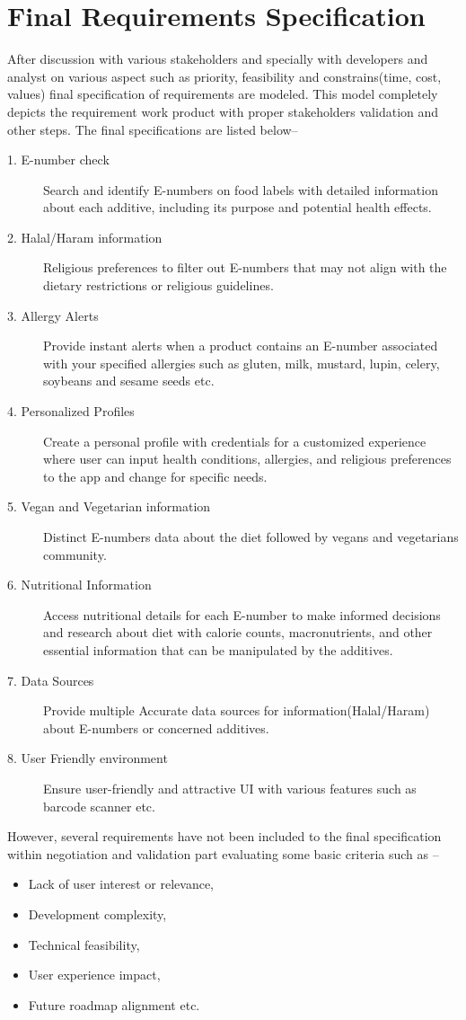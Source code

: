 \documentclass[a4paper,12pt]{report}
\begin{document}
\section*{Final Requirements Specification}
After discussion with various stakeholders and specially with developers and analyst on various aspect such as priority, feasibility and constrains(time, cost, values) final specification of requirements are modeled. This model completely depicts the requirement work product with proper stakeholders validation and other steps. The final specifications are listed below--
\begin{description}
	\item [1. E-number check] Search and identify E-numbers on food labels with detailed information about each additive, including its purpose and potential health effects.
	\item [2. Halal/Haram information] Religious preferences to filter out E-numbers that may not align with the dietary restrictions or religious guidelines.
	\item [3. Allergy Alerts] Provide instant alerts when a product contains an E-number associated with your specified allergies such as gluten, milk, mustard, lupin, celery, soybeans and sesame seeds etc.
	\item [4. Personalized Profiles] Create a personal profile with credentials for a customized experience where user can input health conditions, allergies, and religious preferences to the app and change for specific needs.
	\item [5. Vegan and Vegetarian information] Distinct E-numbers data about the diet followed by vegans and vegetarians community.
	\item [6. Nutritional Information] Access nutritional details for each E-number to make informed decisions and research about diet with calorie counts, macronutrients, and other essential information that can be manipulated by the additives.
	\item [7. Data Sources] Provide multiple Accurate data sources for information(Halal/Haram) about E-numbers or concerned additives.
	\item [8. User Friendly environment] Ensure user-friendly and attractive UI with various features such as barcode scanner etc.
\end{description}

However, several requirements have not been included to the final specification within negotiation and validation part evaluating some basic criteria such as --
\begin{itemize}
	\item Lack of user interest or relevance,
	\item Development complexity,
	\item Technical feasibility,
	\item User experience impact,
	\item Future roadmap alignment etc.
\end{itemize}
\end{document}
